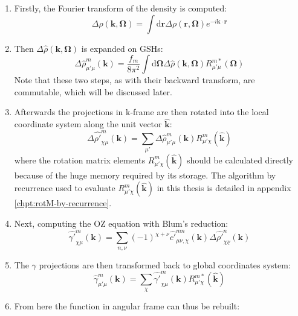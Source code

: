 \begin{enumerate}
\item Firstly, the Fourier transform of the density is computed:
\begin{equation}
\Delta\hat{\rho}(\mathbf{k},\mathbf{\Omega})=\int\mathrm{d}\mathbf{r}\Delta\rho(\mathbf{r},\mathbf{\Omega})e^{-i\mathbf{k}\cdot\mathbf{r}}\label{eq:fft3d-fwd}
\end{equation}
\item Then $\Delta\hat{\rho}(\mathbf{k},\mathbf{\Omega})$ is expanded on
\acs{GSH}s:
\begin{equation}
\Delta\hat{\rho}_{\mu'\mu}^{m}(\mathbf{k})=\frac{f_{m}}{8\pi^{2}}\int\mathrm{d}\mathbf{\Omega}\Delta\hat{\rho}(\mathbf{k},\mathbf{\Omega})R_{\mu'\mu}^{m*}(\mathbf{\Omega})\label{eq:fgsht-fwd}
\end{equation}
Note that these two steps, as with their backward transform,
are commutable, which will be discussed later.
\item Afterwards the projections in k-frame are then rotated into the local
coordinate system along the unit vector $\mathbf{\hat{k}}$:
\begin{equation}
\Delta\hat{\rho'}_{\chi\mu}^{m}(\mathbf{k})=\sum_{\mu'}\Delta\hat{\rho}_{\mu'\mu}^{m}(\mathbf{k})R_{\mu'\chi}^{m}(\mathbf{\hat{k}})\label{eq:2.2.rho-rot-rho}
\end{equation}
where the rotation matrix elements $R_{\mu'\chi}^{m}(\mathbf{\hat{k}})$
should be calculated directly because of the huge memory required
by its storage. The algorithm by recurrence used to evaluate $R_{\mu'\chi}^{m}(\mathbf{\hat{k}})$
in this thesis is detailed in appendix \ref{chpt:rotM-by-recurrence}.
\item Next, computing the OZ equation with Blum's reduction:
\begin{equation}
\hat{\gamma'}_{\chi\mu}^{m}(\mathbf{k})=\sum_{n,\nu}(-1)^{\chi+\nu}\hat{c'}_{\mu\nu,\chi}^{mn}(\mathbf{k})\Delta\hat{\rho'}_{\chi\underline{\nu}}^{n}(\mathbf{k})\label{eq:OZ-2}
\end{equation}
\item The $\gamma$ projections are then transformed back to global coordinates
system:
\begin{equation}
\hat{\gamma}_{\mu'\mu}^{m}(\mathbf{k})=\sum_{\chi}\hat{\gamma'}_{\chi\mu}^{m}(\mathbf{k})R_{\mu'\chi}^{m*}(\mathbf{\hat{k}})
\end{equation}
\item From here the function in angular frame can thus be rebuilt:
\begin{equation}

\end{equation}
\end{enumerate}
